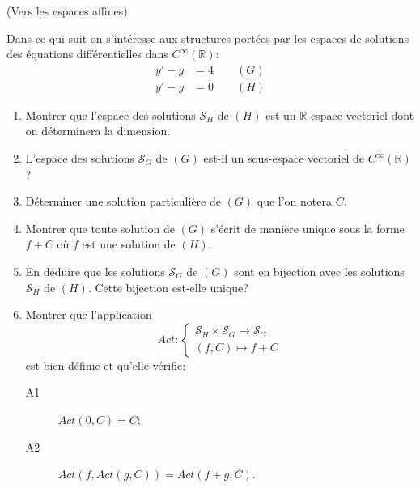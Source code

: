 \documentclass[a4paper,12pt,reqno]{amsart}
\begin{document}
\begin{exo} (Vers les espaces affines)

  Dans ce qui suit on s'intéresse aux structures portées par les espaces de solutions des équations différentielles dans $C^{\infty}(\mathbb{R})$:\vspace{-4mm}
    \begin{align*}
      y' - y &= 4 \qquad (G)\\
      y' - y &= 0 \qquad (H)
    \end{align*}

  \begin{enumerate}
    \item Montrer que l'espace des solutions $\mathcal{S}_{H}$ de $(H)$ est un $\mathbb{R}$-espace vectoriel dont on déterminera la dimension.

    \item L'espace des solutions $\mathcal{S}_{G}$ de $(G)$ est-il un sous-espace vectoriel de $C^{\infty}(\mathbb{R})$?

    \item Déterminer une solution particulière de $(G)$ que l'on notera $C$.

    \item Montrer que toute solution de $(G)$ s'écrit de manière unique sous la forme $f+C$ où $f$ est une solution de $(H)$.

    \item\hard En déduire que les solutions $\mathcal{S}_{G}$ de $(G)$ sont en bijection avec les solutions $\mathcal{S}_{H}$ de $(H)$. Cette bijection est-elle unique?

    \item\hard Montrer que l'application
      \[
        Act:
        \begin{cases}
          \mathcal{S}_{H}\times \mathcal{S}_{G}\rightarrow \mathcal{S}_{G}\\
          (f,C)\mapsto f+C
        \end{cases}
      \]
    est bien définie et qu'elle vérifie:
    \begin{description}
      \item[A1] $Act(0,C)=C$;

      \item[A2] $Act(f,Act(g,C))=Act(f+g,C)$.
    \end{description}
  \end{enumerate}
\end{exo}
\end{document}
